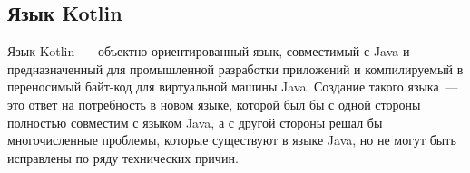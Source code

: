 \subsection{Язык Kotlin}
Язык Kotlin~--- объектно-ориентированный язык, совместимый с Java и предназначенный для промышленной разработки приложений и компилируемый в переносимый байт-код для виртуальной машины Java. Создание такого языка~--- это ответ на потребность в новом языке, которой был бы с одной стороны полностью совместим с языком Java, а с другой стороны решал бы многочисленные проблемы, которые существуют в языке Java, но не могут быть исправлены по ряду технических причин.


